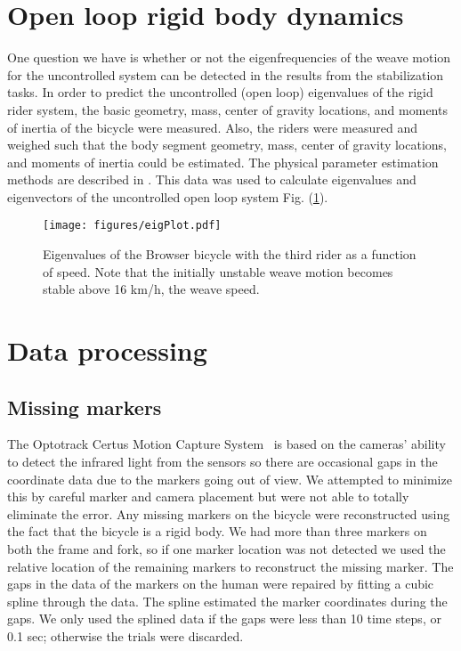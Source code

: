 \section{Open loop rigid body dynamics}
\label{sec:openLoop}
One question we have is whether or not the eigenfrequencies of the weave motion
for the uncontrolled system can be detected in the results from the
stabilization tasks. In order to predict the uncontrolled (open loop)
eigenvalues of the rigid rider system, the basic geometry, mass, center of
gravity locations, and moments of inertia of the bicycle were measured. Also,
the riders were measured and weighed such that the body segment geometry, mass,
center of gravity locations, and moments of inertia could be estimated. The
physical parameter estimation methods are described in \cite{Moore2009a}. This
data was used to calculate eigenvalues and eigenvectors of the uncontrolled open loop system Fig.
(\ref{fig:eigPlot}).
\begin{figure}[tbp]
    \begin{center}
        \texttt{[image: figures/eigPlot.pdf]}
    \end{center}
    \caption{Eigenvalues of the Browser bicycle with the third rider as a
    function of speed. Note that the initially unstable weave motion becomes
    stable above 16 km/h, the weave speed.}
    \label{fig:eigPlot}
\end{figure}

\section{Data processing}
\label{sec:data}

\subsection{Missing markers}
\label{sec:missingMarkers}
The Optotrack Certus Motion Capture
System~\cite{NorthernDigitalIncorporated2009} is based on the cameras' ability
to detect the infrared light from the sensors so there are occasional gaps in
the coordinate data due to the markers going out of view. We attempted to
minimize this by careful marker and camera placement but were not able to
totally eliminate the error. Any missing markers on the bicycle were
reconstructed using the fact that the bicycle is a rigid body. We had more than
three markers on both the frame and fork, so if one marker location was not
detected we used the relative location of the remaining markers to reconstruct
the missing marker. The gaps in the data of the markers on the human were
repaired by fitting a cubic spline through the data. The spline estimated the
marker coordinates during the gaps. We only used the splined data if the gaps
were less than 10 time steps, or 0.1 sec; otherwise the trials were discarded.

